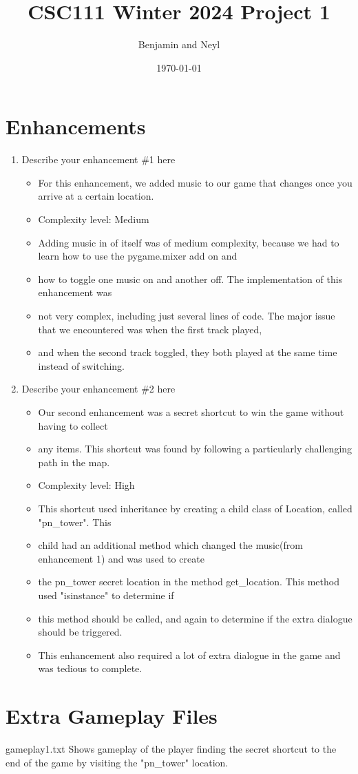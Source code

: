 \documentclass[11pt]{article}
\title{CSC111 Winter 2024 Project 1}
\author{Benjamin and Neyl}
\date{\today}
\begin{document}
\maketitle

\section*{Enhancements}


\begin{enumerate}

\item Describe your enhancement \#1 here
	\begin{itemize}
	\item For this enhancement, we added music to our game that changes once you arrive at a certain location.
	\item Complexity level: Medium
	\item Adding music in of itself was of medium complexity, because we had to learn how to use the pygame.mixer add on and
	\item how to toggle one music on and another off. The implementation of this enhancement was
	\item not very complex, including just several lines of code. The major issue that we encountered was when the first track played,
	\item and when the second track toggled, they both played at the same time instead of switching.

	\end{itemize}

\item Describe your enhancement \#2 here
	\begin{itemize}
	\item Our second enhancement was a secret shortcut to win the game without having to collect
	\item any items. This shortcut was found by following a particularly challenging path in the map.
	\item Complexity level: High
	\item This shortcut used inheritance by creating a child class of Location, called "pn_tower". This
	\item child had an additional method which changed the music(from enhancement 1) and was used to create
	\item the pn_tower secret location in the method get_location. This method used "isinstance" to determine if
	\item this method should be called, and again to determine if the extra dialogue should be triggered.
	\item This enhancement also required a lot of extra dialogue in the game and was tedious to complete.

	\end{itemize}

\end{enumerate}


\section*{Extra Gameplay Files}

gameplay1.txt
Shows gameplay of the player finding the secret shortcut to the end of the game by visiting the "pn_tower" location.
\end{document}
